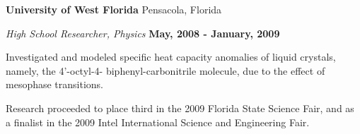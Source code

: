 {\bf University of West Florida} \hfill{ Pensacola, Florida}

\vspace*{-.05in}
{\em  High School Researcher, Physics} \hfill {\bf May, 2008 - January, 2009}

\begin{list1}
\item[] Investigated and modeled specific heat capacity anomalies of liquid crystals, namely, the 4'-octyl-4-
biphenyl-carbonitrile molecule, due to the effect of mesophase transitions.
\item[] Research proceeded to place third in the 2009 Florida State Science Fair, and as a finalist in the
2009 Intel International Science and Engineering Fair.
\end{list1}